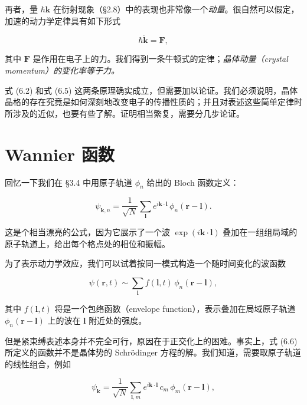 再者，量 $\hbar\mathbf{k}$ 在衍射现象（§2.8）中的表现也非常像一个\emph{动量}。很自然可以假定，加速的动力学定律具有如下形式

\begin{equation*}
\hbar\dot{\mathbf{k}} = \mathbf{F},
\tag{6.5}
\end{equation*}

其中 $\mathbf{F}$ 是作用在电子上的力。我们得到一条牛顿式的定律；\emph{晶体动量（crystal momentum）的变化率等于力。}

式 (6.2) 和式 (6.5) 这两条原理确实成立，但需要加以论证。我们必须说明，晶体晶格的存在究竟是如何深刻地改变电子的传播性质的；并且对表述这些简单定律时所涉及的近似，也要有些了解。证明相当繁复，需要分几步论证。

\section{Wannier 函数}

回忆一下我们在 §3.4 中用原子轨道 $\phi_n$ 给出的 Bloch 函数定义：

\begin{equation*}
\psi_{\mathbf{k},n} = \frac{1}{\sqrt{N}}\sum_{\boldsymbol{l}} e^{i\mathbf{k}\cdot\boldsymbol{l}}\,\phi_n(\mathbf{r}-\boldsymbol{l}).
\tag{6.6}
\end{equation*}

这是个相当漂亮的公式，因为它展示了一个波 $\exp(i\mathbf{k}\cdot\boldsymbol{l})$ 叠加在一组组局域的原子轨道上，给出每个格点处的相位和振幅。


为了表示动力学效应，我们可以试着按同一模式构造一个随时间变化的波函数

\begin{equation*}
\psi(\mathbf{r},t) \sim \sum_{\boldsymbol{l}} f(\boldsymbol{l},t)\,\phi_n(\mathbf{r}-\boldsymbol{l}),
\tag{6.7}
\end{equation*}

其中 $f(\boldsymbol{l},t)$ 将是一个包络函数（envelope function），表示叠加在局域原子轨道 $\phi_n(\mathbf{r}-\boldsymbol{l})$ 上的波在 $\boldsymbol{l}$ 附近处的强度。

但是紧束缚表述本身并不完全可行，原因在于正交化上的困难。事实上，式 (6.6) 所定义的函数并不是晶体势的 Schrödinger 方程的解。我们知道，需要取原子轨道的线性组合，例如

\begin{equation*}
\psi_{\mathbf{k}} = \frac{1}{\sqrt{N}}\sum_{\boldsymbol{l},m} e^{i\mathbf{k}\cdot\boldsymbol{l}}\,c_m\,\phi_m(\mathbf{r}-\boldsymbol{l}),
\tag{6.8}
\end{equation*}

